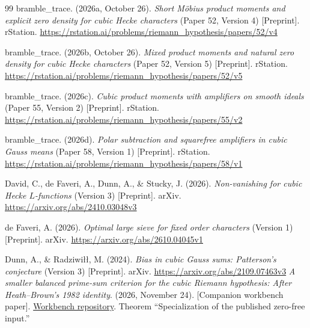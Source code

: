 \documentclass[11pt]{article}
\theoremstyle{remark}\newtheorem{remark}[theorem]{Remark}
\newcommand{\workbenchurl}{https://github.com/KokunoYumeto/zeta-and-l-functions-workbench}
\begin{document}
\begin{thebibliography}{99}
bramble\_trace. (2026a, October 26). \emph{Short M\"obius product moments and explicit zero density for cubic Hecke characters} (Paper 52, Version 4) [Preprint]. rStation. \url{https://rstation.ai/problems/riemann_hypothesis/papers/52/v4}

bramble\_trace. (2026b, October 26). \emph{Mixed product moments and natural zero density for cubic Hecke characters} (Paper 52, Version 5) [Preprint]. rStation. \url{https://rstation.ai/problems/riemann_hypothesis/papers/52/v5}

bramble\_trace. (2026c). \emph{Cubic product moments with amplifiers on smooth ideals} (Paper 55, Version 2) [Preprint]. rStation. \url{https://rstation.ai/problems/riemann_hypothesis/papers/55/v2}

bramble\_trace. (2026d). \emph{Polar subtraction and squarefree amplifiers in cubic Gauss means} (Paper 58, Version 1) [Preprint]. rStation. \url{https://rstation.ai/problems/riemann_hypothesis/papers/58/v1}

David, C., de Faveri, A., Dunn, A., \& Stucky, J. (2026). \emph{Non-vanishing for cubic Hecke $L$-functions} (Version 3) [Preprint]. arXiv. \url{https://arxiv.org/abs/2410.03048v3}

de Faveri, A. (2026). \emph{Optimal large sieve for fixed order characters} (Version 1) [Preprint]. arXiv. \url{https://arxiv.org/abs/2610.04045v1}

Dunn, A., \& Radziwi\l\l, M. (2024). \emph{Bias in cubic Gauss sums: Patterson's conjecture} (Version 3) [Preprint]. arXiv. \url{https://arxiv.org/abs/2109.07463v3}
\emph{A smaller balanced prime-sum criterion for the cubic Riemann hypothesis: After Heath--Brown's 1982 identity}. (2026, November 24). [Companion workbench paper]. \href{\workbenchurl}{Workbench repository}. Theorem ``Specialization of the published zero-free input.''

\end{thebibliography}
\end{document}
